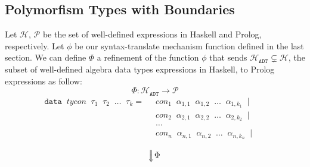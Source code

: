\documentclass{report}
\theoremstyle{definition}
\theoremstyle{definition}
\newcommand{\ttt}[1]{\texttt{#1}}
\newcommand{\tav}{\;\;}
\newcommand{\SLongdownarrow}{\mathrel{\rotatebox[origin=c]{-90}{$\Longrightarrow$}}}
\begin{document}
	\subsection{Polymorfism Types with Boundaries}
	Let $\mathcal{H}$, $\mathcal{P}$ be the set of well-defined expressions in Haskell and Prolog, respectively. Let $\phi$ be our syntax-translate mechanism function defined in the last section. We can define $\Phi$ a refinement of the function $\phi$ that sends $\mathcal{H}_{\ttt{ADT}} \subsetneq \mathcal{H}$, the subset of well-defined algebra data types expressions in Haskell, to Prolog expressions as follow: $$\Phi: \mathcal{H}_{\ttt{ADT}} \longrightarrow \mathcal{P} $$
	\begin{align*}
		\ttt{data} \tav tycon \tav \tau_1 \tav \tau_2 \tav \ldots \tav \tau_k 	= & \tav con_1 \tav \alpha_{1,1} \tav \alpha_{1,2} \tav \ldots \tav \alpha_{1,k_1} \tav | &   &   \\
		                                                                         & \tav con_2 \tav \alpha_{2,1} \tav \alpha_{2,2} \tav \ldots \tav \alpha_{2,k_2} \tav | &   &   \\
		                                                                         & \tav \ldots \tav                                                                      &   &   \\
		                                                                         & \tav con_n \tav \alpha_{n,1} \tav \alpha_{n,2} \tav \ldots \tav \alpha_{n,k_n} \tav | &   &   \\
	\end{align*}
	$$\SLongdownarrow \Phi$$
\end{document}
